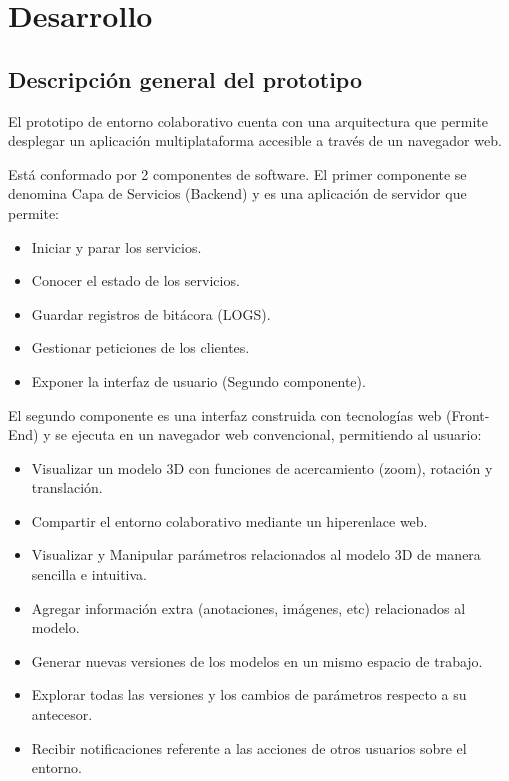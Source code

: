 \chapter{Desarrollo}
\label{chap: cap3}

\section{Descripción general del prototipo}
El prototipo de entorno colaborativo cuenta con una arquitectura que permite desplegar un aplicación multiplataforma accesible a través de un navegador web.

Está conformado por 2 componentes de software.
El primer componente se denomina Capa de Servicios (Backend) y es una aplicación de servidor que permite:
\begin{itemize}
  \item Iniciar y parar los servicios. 
  \item Conocer el estado de los servicios.
  \item Guardar registros de bitácora (LOGS).
  \item Gestionar peticiones de los clientes.
  \item Exponer la interfaz de usuario (Segundo componente).
\end{itemize}

El segundo componente es una interfaz construida con tecnologías web (Front-End) y se ejecuta en un navegador web convencional, permitiendo al usuario:
\begin{itemize}
  \item Visualizar un modelo 3D con funciones de acercamiento (zoom), rotación y translación.
  \item Compartir el entorno colaborativo mediante un hiperenlace web.
  \item Visualizar y Manipular parámetros relacionados al modelo 3D de manera sencilla e intuitiva.
  \item Agregar información extra (anotaciones, imágenes, etc) relacionados al modelo.
  \item Generar nuevas versiones de los modelos en un mismo espacio de trabajo.
  \item Explorar todas las versiones y los cambios de parámetros respecto a su antecesor.
  \item Recibir notificaciones referente a las acciones de otros usuarios sobre el entorno.
 
\end{itemize}

